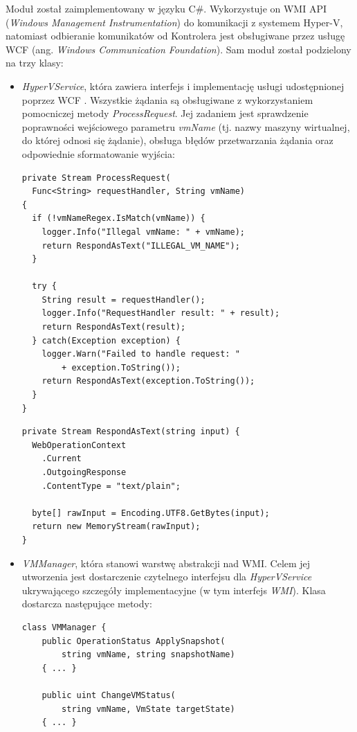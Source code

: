 \documentclass[a4paper,12pt,oneside]{article}
\begin{document}
	Moduł został zaimplementowany w języku C\#. Wykorzystuje on WMI \cite{www-wmi} API (\textit{Windows Management Instrumentation}) do komunikacji z systemem Hyper-V, natomiast odbieranie komunikatów od Kontrolera jest obsługiwane przez usługę WCF (ang. \textit{Windows Communication Foundation}). Sam moduł został podzielony na trzy klasy:
	\begin{itemize}
		\item \textit{HyperVService}, która zawiera interfejs i implementację usługi udostępnionej poprzez WCF \cite{www-wcf}. Wszystkie żądania są obsługiwane z wykorzystaniem pomocniczej metody \textit{ProcessRequest}. Jej zadaniem jest sprawdzenie poprawności wejściowego parametru \textit{vmName} (tj. nazwy maszyny wirtualnej, do której odnosi się żądanie), obsługa błędów przetwarzania żądania oraz odpowiednie sformatowanie wyjścia:
		\begin{lstlisting}[language={[Sharp]C}]
private Stream ProcessRequest(
  Func<String> requestHandler, String vmName) 
{
  if (!vmNameRegex.IsMatch(vmName)) {
    logger.Info("Illegal vmName: " + vmName);
   	return RespondAsText("ILLEGAL_VM_NAME");
  }

  try {
    String result = requestHandler();
    logger.Info("RequestHandler result: " + result);
    return RespondAsText(result);
  } catch(Exception exception) { 
    logger.Warn("Failed to handle request: " 
		+ exception.ToString());
    return RespondAsText(exception.ToString());
  }
}
		\end{lstlisting}
		
		\begin{lstlisting}[language={[Sharp]C}]
private Stream RespondAsText(string input) {
  WebOperationContext
    .Current
	.OutgoingResponse
	.ContentType = "text/plain";
		
  byte[] rawInput = Encoding.UTF8.GetBytes(input);
  return new MemoryStream(rawInput);
}
		\end{lstlisting}
	
		\item \textit{VMManager}, która stanowi warstwę abstrakcji nad WMI. Celem jej utworzenia jest dostarczenie czytelnego interfejsu dla \textit{HyperVService} ukrywającego szczegóły implementacyjne (w tym interfejs \textit{WMI}). Klasa dostarcza następujące metody:
		\begin{lstlisting}[language={[Sharp]C}]
class VMManager {
    public OperationStatus ApplySnapshot(
    	string vmName, string snapshotName)
    { ... }

    public uint ChangeVMStatus(
    	string vmName, VmState targetState)
    { ... }
    

\end{lstlisting}
\end{itemize}
\end{document}
